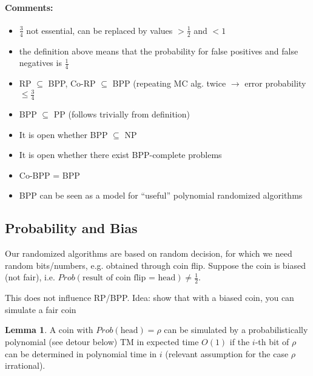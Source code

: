 \documentclass[11pt]{article}
\theoremstyle{definition}
\newtheorem{lemma}[theorem]{Lemma}
\theoremstyle{definition}
\begin{document}
\paragraph{Comments:}
\begin{itemize}
\item $ \frac{3}{4} $ not essential, can be replaced by values $ > \frac{1}{2} $ and $ < 1 $
\item the definition above means that the probability for false positives and false negatives is $ \frac{1}{4} $
\item RP $ \subseteq $ BPP, Co-RP $ \subseteq $ BPP (repeating MC alg. twice $ \rightarrow $ error probability $ \leq \frac{3}{4} $
\item BPP $ \subseteq $ PP (follows trivially from definition)
\item It is open whether BPP $ \subseteq $ NP
\item It is open whether there exist BPP-complete problems
\item Co-BPP = BPP
\item BPP can be seen as a model for ``useful'' polynomial randomized algorithms
\end{itemize}

\subsection{Probability and Bias}

Our randomized algorithms are based on random decision, for which we need random bits/numbers, e.g. obtained through coin flip. Suppose the coin is biased (not fair), i.e. $ Prob(\text{result of coin flip = head}) \neq \frac{1}{2} $.

This does not influence RP/BPP. Idea: show that with a biased coin, you can simulate a fair coin

\begin{lemma}

A coin with $ Prob(\text{head}) = \rho $ can be simulated by a probabilistically polynomial (see detour below) %
TM in expected time $ O(1) $ if the $i$-th bit of $ \rho $ can be determined in polynomial time in $ i $ (relevant assumption for the case $ \rho $ irrational).

\end{lemma}
\end{document}
